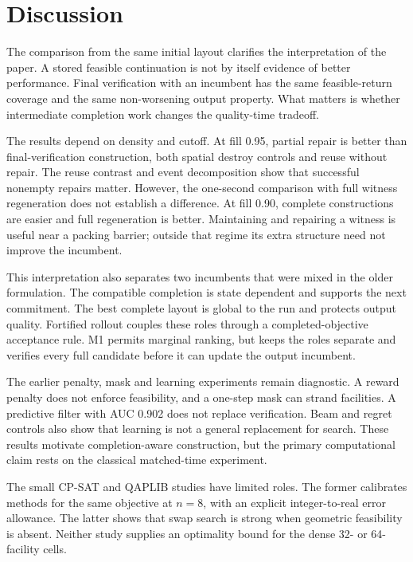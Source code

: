 \documentclass[preprint,12pt,authoryear]{elsarticle}
\begin{document}
\section{Discussion}
\label{sec:discussion}

The comparison from the same initial layout clarifies the interpretation of the
paper. A stored feasible continuation is not by itself evidence of better
performance. Final
verification with an incumbent has the same feasible-return coverage and the
same non-worsening output property. What matters is whether intermediate
completion work changes the quality-time tradeoff.

The results depend on density and cutoff. At fill 0.95, partial repair is better than
final-verification construction, both spatial destroy controls and reuse without
repair. The reuse contrast and event decomposition show that successful
nonempty repairs matter. However, the one-second comparison with full witness
regeneration does not establish a difference. At fill 0.90, complete
constructions are easier and full regeneration is better. Maintaining and
repairing a witness is useful near a packing barrier; outside that regime its
extra structure need not improve the incumbent.

This interpretation also separates two incumbents that were mixed in the older
formulation. The compatible completion is state dependent and supports the next
commitment. The best complete layout is global to the run and protects output
quality. Fortified rollout couples these roles through a completed-objective
acceptance rule. M1 permits marginal ranking, but keeps the roles separate and
verifies every full candidate before it can update the output incumbent.

The earlier penalty, mask and learning experiments remain diagnostic. A reward
penalty does not enforce feasibility, and a one-step mask can strand facilities.
A predictive filter with AUC 0.902 does not replace verification. Beam and regret
controls also show that learning is not a general replacement for search. These
results motivate completion-aware construction, but the primary computational
claim rests on the classical matched-time experiment.

The small CP-SAT and QAPLIB studies have limited roles. The former calibrates
methods for the same objective at $n=8$, with an explicit integer-to-real error
allowance. The latter shows that swap search is strong when geometric
feasibility is absent. Neither study supplies an optimality bound for the dense
32- or 64-facility cells.
\end{document}
